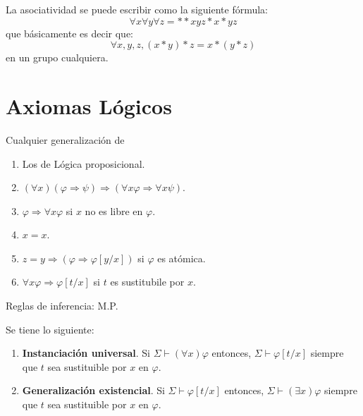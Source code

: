 \documentclass[12pt]{report}
\theoremstyle{largebreak}
\begin{document}
    \begin{exa}
        La asociatividad se puede escribir como la siguiente fórmula:
        \begin{equation*}
            \forall x\forall y\forall z=**xyz*x*yz
        \end{equation*}
        que básicamente es decir que:
        \begin{equation*}
            \forall x,y,z, (x*y)*z=x*(y*z)
        \end{equation*}
        en un grupo cualquiera.
    \end{exa}

    \section{Axiomas Lógicos}

    Cualquier generalización de 
    \begin{enumerate}
        \item Los de Lógica proposicional.
        \item $(\forall x)(\varphi\Rightarrow \psi)\Rightarrow (\forall x\varphi\Rightarrow\forall x\psi)$.
        \item $\varphi\Rightarrow\forall x\varphi$ si $x$ no es libre en $\varphi$.
        \item $x=x$.
        \item $z=y\Rightarrow(\varphi\Rightarrow\varphi\left[y/x\right])$ si $\varphi$ es atómica.
        \item $\forall x\varphi\Rightarrow\varphi\left[t/x \right]$ si $t$ es sustitubile por $x$.
    \end{enumerate}

    Reglas de inferencia: M.P.

    \begin{theor}
        Se tiene lo siguiente:
        \begin{enumerate}
            \item \textbf{Instanciación universal}. Si $\Sigma\vdash(\forall x)\varphi$ entonces, $\Sigma\vdash\varphi[t/x]$ siempre que $t$ sea sustituible por $x$ en $\varphi$.
            \item \textbf{Generalización existencial}. Si $\Sigma\vdash\varphi[t/x]$ entonces, $\Sigma\vdash\left(\exists x \right)\varphi$ siempre que $t$ sea sustituible por $x$ en $\varphi$.
        \end{enumerate}
    \end{theor}
\end{document}
